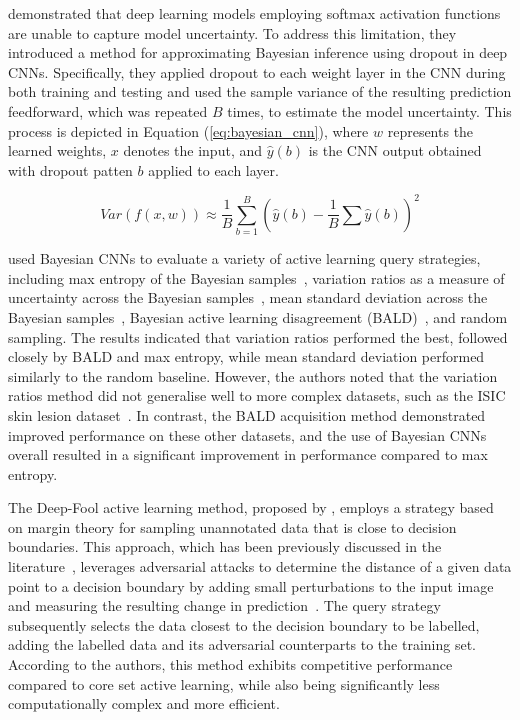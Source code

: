 \cite{gal2016dropout} demonstrated that deep learning models employing softmax activation functions are unable to capture model uncertainty. To address this limitation, they introduced a method for approximating Bayesian inference using dropout in deep CNNs. Specifically, they applied dropout to each weight layer in the CNN during both training and testing and used the sample variance of the resulting prediction feedforward, which was repeated $B$ times, to estimate the model uncertainty. This process is depicted in Equation (\ref{eq:bayesian_cnn}), where $w$ represents the learned weights, $x$ denotes the input, and $\widehat{y}(b)$ is the CNN output obtained with dropout patten $b$ applied to each layer.

\begin{equation}
	Var(f(x, w))\approx\frac{1}{B}\sum^B_{b=1}\left(\widehat{y}(b)-\frac{1}{B}\sum\widehat{y}(b)\right)^2
	\label{eq:bayesian_cnn}
\end{equation}

\cite{gal2017deep} used Bayesian CNNs to evaluate a variety of active learning query strategies, including max entropy of the Bayesian samples~\citep{shannon1948mathematical}, variation ratios as a measure of uncertainty across the Bayesian samples~\citep{freeman1965elementary}, mean standard deviation across the Bayesian samples~\citep{kampffmeyer2016semantic}, Bayesian active learning disagreement (BALD)~\citep{houlsby2011bayesian}, and random sampling. The results indicated that variation ratios performed the best, followed closely by BALD and max entropy, while mean standard deviation performed similarly to the random baseline. However, the authors noted that the variation ratios method did not generalise well to more complex datasets, such as the ISIC skin lesion dataset~\citep{gutman2016skin}. In contrast, the BALD acquisition method demonstrated improved performance on these other datasets, and the use of Bayesian CNNs overall resulted in a significant improvement in performance compared to max entropy.

The Deep-Fool active learning method, proposed by \cite{ducoffe2018adversarial}, employs a strategy based on margin theory for sampling unannotated data that is close to decision boundaries. This approach, which has been previously discussed in the literature~\citep{settles2009active}, leverages adversarial attacks to determine the distance of a given data point to a decision boundary by adding small perturbations to the input image and measuring the resulting change in prediction~\citep{kurakin2016adversarial}. The query strategy subsequently selects the data closest to the decision boundary to be labelled, adding the labelled data and its adversarial counterparts to the training set.  According to the authors, this method exhibits competitive performance compared to core set active learning, while also being significantly less computationally complex and more efficient.

